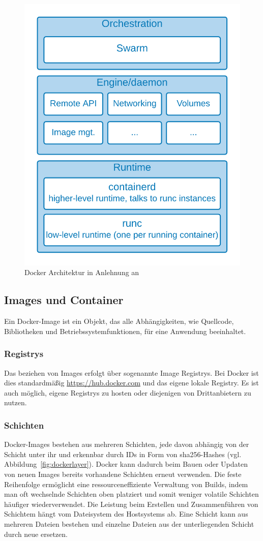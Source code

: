 \begin{figure}
    \centering
    \includegraphics[width=0.5\columnwidth]{images/DockerArch.png}
    \caption{Docker Architektur in Anlehnung an \protect\cite[S.11]{dockerdeep}}
    \label{fig:dockerarch}
\end{figure}

\subsection{Images und Container}
Ein Docker-Image ist ein Objekt, das alle Abhängigkeiten, wie Quellcode, Bibliotheken und Betriebssystemfunktionen, für eine Anwendung beeinhaltet. 

\subsubsection{Registrys}
Das beziehen von Images erfolgt über sogenannte Image Registrys.
Bei Docker ist dies standardmäßig \url{https://hub.docker.com} und das eigene lokale Registry. 
Es ist auch möglich, eigene Registrys zu hosten oder diejenigen von Drittanbietern zu nutzen.

\subsubsection{Schichten}
Docker-Images bestehen aus mehreren Schichten, jede davon abhängig von der Schicht unter ihr und
erkennbar durch IDs in Form von \acs{sha}256-Hashes (vgl. Abbildung~\ref{fig:dockerlayer}).
Docker kann dadurch beim Bauen oder Updaten von neuen Images bereits vorhandene Schichten erneut verwenden. 
Die feste Reihenfolge ermöglicht eine ressourceneffiziente Verwaltung von Builds,
indem man oft wechselnde Schichten oben platziert und somit weniger volatile Schichten häufiger wiederverwendet. 
Die Leistung beim Erstellen und Zusammenführen von Schichtem hängt vom Dateisystem des Hostsystems ab.
Eine Schicht kann aus mehreren Dateien bestehen
und einzelne Dateien aus der unterliegenden Schicht durch neue ersetzen.

